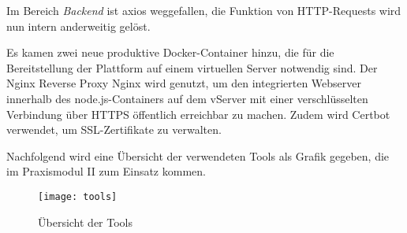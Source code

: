 Im Bereich \textit{Backend} ist axios weggefallen, die Funktion von HTTP-Requests wird nun intern anderweitig gelöst.

Es kamen zwei neue produktive Docker-Container hinzu, die für die Bereitstellung der Plattform auf einem virtuellen Server notwendig sind.
Der Nginx Reverse Proxy Nginx wird genutzt, um den integrierten Webserver innerhalb des node.js-Containers auf dem vServer mit einer verschlüsselten Verbindung über HTTPS öffentlich erreichbar zu machen.
Zudem wird Certbot verwendet, um SSL-Zertifikate zu verwalten.

Nachfolgend wird eine Übersicht der verwendeten Tools als Grafik gegeben, die im Praxismodul II zum Einsatz kommen.

\begin{figure}[H]
    \centering
    \texttt{[image: tools]}
    \caption{Übersicht der Tools}\label{fig:uebersicht-tools}
\end{figure}


